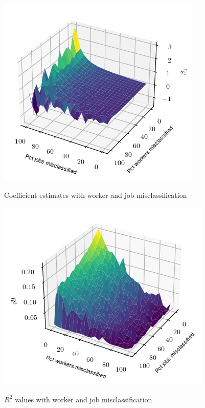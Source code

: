 \documentclass[12pt]{article}
\theoremstyle{definition}
\theoremstyle{plain}
\begin{document}
\begin{figure}
	\centering
	\caption{Coefficient estimates with worker and job misclassification}
	\includegraphics[width=\textwidth]{../Results/misclassification_demo_coef.png}\\
	\label{fig:misclassification_demo_coef}
\end{figure}


\begin{figure}
	\centering
	\caption{$R^2$ values with worker and job misclassification}
	\includegraphics[width=\textwidth]{../Results/misclassification_demo_r2.png}\\
	\label{fig:misclassification_demo_r2}
\end{figure}
\end{document}
